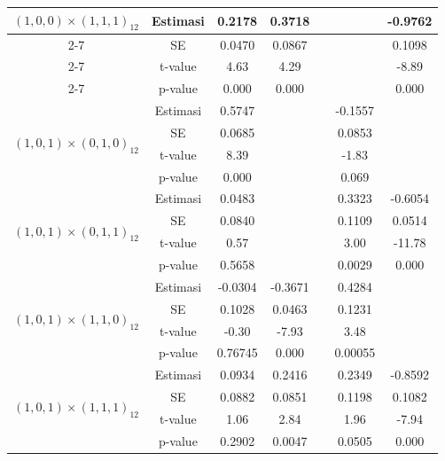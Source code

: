 \begin{enumerate}[label=\alph*.]
\begin{longtable}{|c|c|c|c|c|c|c|}
            \multirow{4}{*}{$(1,0,0)\times(1,1,1)_{12}$}
            & Estimasi & 0.2178 & 0.3718 &  &  & -0.9762 \\ \cline{2-7}
            & SE       & 0.0470 & 0.0867 &  &  & 0.1098  \\ \cline{2-7}
            & t-value  & 4.63   & 4.29   &  &  & -8.89  \\ \cline{2-7}
            & p-value  & 0.000  & 0.000  &  &  & 0.000  \\ \hline

            \multirow{4}{*}{$(1,0,1)\times(0,1,0)_{12}$}
            & Estimasi & 0.5747 &  &  & -0.1557 &  \\ \cline{2-7}
            & SE       & 0.0685 &  &  & 0.0853  &  \\ \cline{2-7}
            & t-value  & 8.39   &  &  & -1.83  &  \\ \cline{2-7}
            & p-value  & 0.000  &  &  & 0.069  &  \\ \hline

            \multirow{4}{*}{$(1,0,1)\times(0,1,1)_{12}$}
            & Estimasi & 0.0483 &  &  & 0.3323 & -0.6054 \\ \cline{2-7}
            & SE       & 0.0840 &  &  & 0.1109 & 0.0514  \\ \cline{2-7}
            & t-value  & 0.57   &  &  & 3.00   & -11.78 \\ \cline{2-7}
            & p-value  & 0.5658 &  &  & 0.0029 & 0.000  \\ \hline

            \multirow{4}{*}{$(1,0,1)\times(1,1,0)_{12}$}
            & Estimasi & -0.0304 & -0.3671 &  & 0.4284 &  \\ \cline{2-7}
            & SE       & 0.1028  & 0.0463  &  & 0.1231 &  \\ \cline{2-7}
            & t-value  & -0.30   & -7.93   &  & 3.48   &  \\ \cline{2-7}
            & p-value  & 0.76745 & 0.000   &  & 0.00055 &  \\ \hline

            \multirow{4}{*}{$(1,0,1)\times(1,1,1)_{12}$}
            & Estimasi & 0.0934 & 0.2416 &  & 0.2349 & -0.8592 \\ \cline{2-7}
            & SE       & 0.0882 & 0.0851 &  & 0.1198 & 0.1082  \\ \cline{2-7}
            & t-value  & 1.06   & 2.84   &  & 1.96   & -7.94  \\ \cline{2-7}
            & p-value  & 0.2902 & 0.0047 &  & 0.0505 & 0.000  \\ \hline


\end{longtable}
\end{enumerate}
